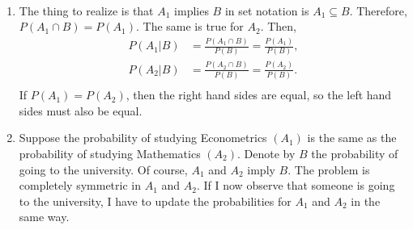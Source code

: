 

\setcounter{theorem}{8}

\begin{exercise} [BH.2.9] 
\begin{solution}~
	\begin{enumerate}
		\item The thing to realize is that $A_{1}$ implies $B$ in set notation is $A_{1}\subseteq B$. Therefore, $P(A_{1}\cap B) = P(A_1)$. The same is true for $A_{2}$. Then,
		\begin{align*}
			P(A_{1}|B) &= \frac{P(A_{1}\cap B)}{P(B)} = \frac{P(A_{1})}{P(B)},\\
			P(A_{2}|B) &= \frac{P(A_{2}\cap B)}{P(B)} = \frac{P(A_{2})}{P(B)}.\\
		\end{align*}
		If $P(A_{1})=P(A_{2})$, then the right hand sides are equal, so the left hand sides must also be equal.
		\item Suppose the probability of studying Econometrics $(A_{1})$ is the same as the probability of studying Mathematics $(A_{2})$. Denote by $B$ the probability of going to the university. Of course, $A_{1}$ and $A_{2}$ imply $B$. The problem is completely symmetric in $A_{1}$ and $A_{2}$. If I now observe that someone is going to the university, I have to update the probabilities for $A_{1}$ and $A_{2}$ in the same way. 
	\end{enumerate}
  \end{solution}
\end{exercise}


